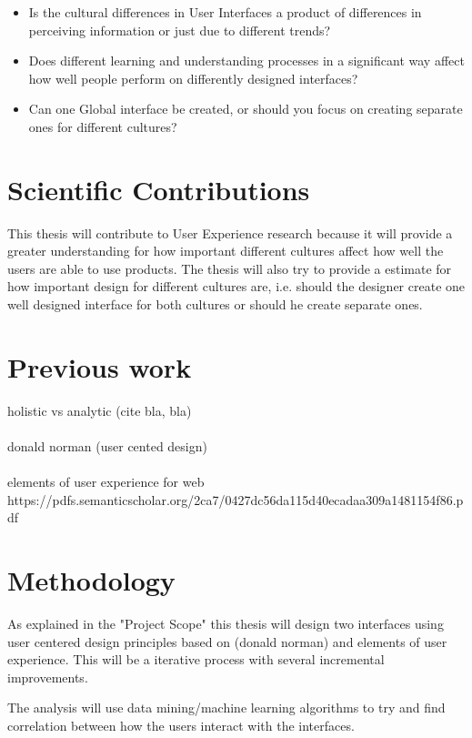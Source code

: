 \documentclass[a4paper, 11pt]{article} %
\begin{document}
\begin{itemize}
	\item Is the cultural differences in User Interfaces a product of differences in perceiving information or just due to different trends?
	\item Does different learning and understanding processes in a significant way affect how well people perform on differently designed interfaces?
	\item Can one Global interface be created, or should you focus on creating separate ones for different cultures?
\end{itemize}


\section*{Scientific Contributions}

This thesis will contribute to User Experience research because it will provide a greater understanding for how important different cultures affect how well the users are able to use products. The thesis will also try to provide a estimate for how important design for different cultures are, i.e. should the designer create one well designed interface for both cultures or should he create separate ones.

\section*{Previous work}
holistic vs analytic (cite bla, bla)
\\\\
donald norman (user cented design)
\\\\
elements of user experience for web
https://pdfs.semanticscholar.org/2ca7/0427dc56da115d40ecadaa309a1481154f86.pdf




\section*{Methodology}
As explained in the "Project Scope" this thesis will design two interfaces using user centered design principles based on (donald norman) and elements of user experience. This will be a iterative process with several incremental improvements. 

The analysis will use data mining/machine learning algorithms to try and find correlation between how the users interact with the interfaces.
\end{document}
